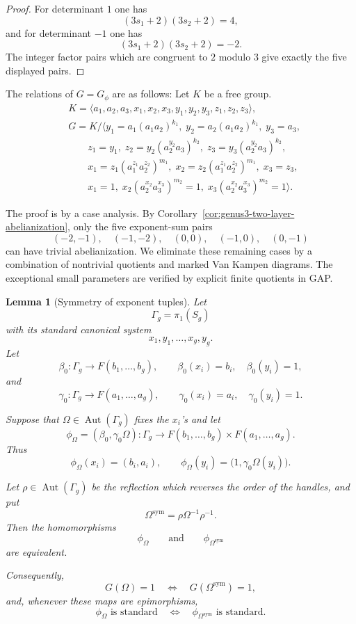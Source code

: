 \documentclass{article}
\newtheorem{lm}[theorem]{Lemma}
\DeclareMathOperator{\Aut}{Aut}
\begin{document}
\begin{proof}
For determinant $1$ one has
\[
 (3s_1+2)(3s_2+2)=4,
\]
and for determinant $-1$ one has
\[
 (3s_1+2)(3s_2+2)=-2.
\]
The integer factor pairs which are congruent to $2$ modulo $3$ give exactly
the five displayed pairs.
\end{proof}

The relations of $G=G_{\phi} $ are as follows: Let $K$ be a free group.
\[
\begin{aligned}
&K = \langle a_1,a_2,a_3,x_1,x_2,x_3,y_1,y_2,y_3,z_1,z_2,z_3 \rangle, \\[3pt]
&G = K \Big/ \Big\langle 
y_1 = a_1 (a_1 a_2)^{k_1},\;
 y_2 = a_2 (a_1 a_2)^{k_1},\;
 y_3 = a_3, \\[3pt]
&\qquad z_1 = y_1,\;
 z_2 = y_2 (a_2^{y_2} a_3)^{k_2},\;
 z_3 = y_3 (a_2^{y_2} a_3)^{k_2},\\[3pt]
&\qquad x_1 = z_1 (a_1^{z_1} a_2^{z_2})^{m_1},\;
 x_2 = z_2 (a_1^{z_1} a_2^{z_2})^{m_1},\;
 x_3 = z_3,\\[3pt]
&\qquad x_1 = 1,\;
 x_2 (a_2^{x_2} a_3^{x_3})^{m_2} = 1,\;
 x_3 (a_2^{x_2} a_3^{x_3})^{m_2} = 1
\Big\rangle.
\end{aligned}
\]


The proof is by a case analysis.  By
Corollary~\ref{cor:genus3-two-layer-abelianization}, only the five exponent-sum
pairs
\[
(-2,-1),\quad (-1,-2),\quad (0,0),\quad (-1,0),\quad (0,-1)
\]
can have trivial abelianization.  We eliminate these remaining cases by a combination of nontrivial
quotients and marked Van Kampen diagrams.  The exceptional small parameters
are verified by explicit finite quotients in GAP.


\begin{lm}[Symmetry of exponent tuples]
\label{lem:symmetric-tuples}
Let
\[
   \Gamma_g=\pi_1(S_g)
\]
with its standard canonical system
\[
   x_1,y_1,\ldots,x_g,y_g.
\]
Let
\[
   \beta_0:\Gamma_g\longrightarrow F(b_1,\ldots,b_g),
   \qquad
   \beta_0(x_i)=b_i,\quad \beta_0(y_i)=1,
\]
and
\[
   \gamma_0:\Gamma_g\longrightarrow F(a_1,\ldots,a_g),
   \qquad
   \gamma_0(x_i)=a_i,\quad \gamma_0(y_i)=1.
\]

Suppose that \(\Omega\in\Aut(\Gamma_g)\) fixes the \(x_i\)'s and let
\[
   \phi_\Omega=(\beta_0,\gamma_0\Omega):
   \Gamma_g\longrightarrow
   F(b_1,\ldots,b_g)\times F(a_1,\ldots,a_g).
\]
Thus
\[
   \phi_\Omega(x_i)=(b_i,a_i),
   \qquad
   \phi_\Omega(y_i)=
   \bigl(1,\gamma_0\Omega(y_i)\bigr).
\]

Let \(\rho\in\Aut(\Gamma_g)\) be the reflection which reverses the
order of the handles, and put
\[
   \Omega^{\mathrm{sym}}
   =\rho\Omega^{-1}\rho^{-1}.
\]
Then the homomorphisms
\[
   \phi_\Omega
   \qquad\text{and}\qquad
   \phi_{\Omega^{\mathrm{sym}}}
\]
are equivalent.

Consequently,
\[
   G(\Omega)=1
   \quad\Longleftrightarrow\quad
   G(\Omega^{\mathrm{sym}})=1,
\]
and, whenever these maps are epimorphisms,
\[
   \phi_\Omega\text{ is standard}
   \quad\Longleftrightarrow\quad
   \phi_{\Omega^{\mathrm{sym}}}\text{ is standard}.
\]
\end{lm}
\end{document}
